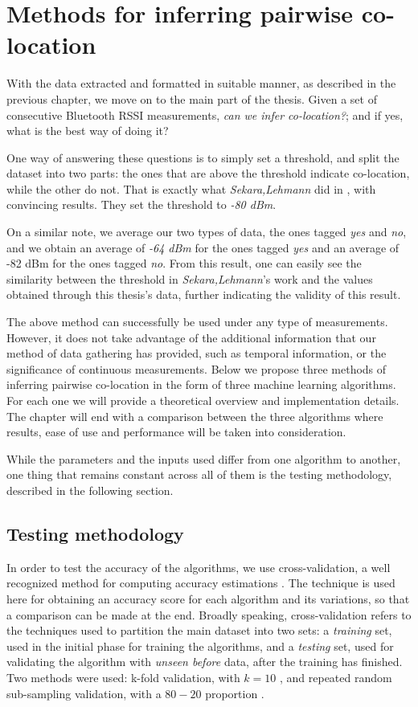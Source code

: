 \chapter{Methods for inferring pairwise co-location}

With the data extracted and formatted in suitable manner, as described in the previous chapter, we move on to the main part of the thesis. Given a set of consecutive Bluetooth RSSI measurements, \textit{can we infer co-location?}; and if yes, what is the best way of doing it? 

One way of answering these questions is to simply set a threshold, and split the dataset into two parts: the ones that are above the threshold indicate co-location, while the other do not. That is exactly what \textit{Sekara,Lehmann} did in \cite{vedran}, with convincing results. They set the threshold to \textit{ -80 dBm}. 

On a similar note, we average our two types of data, the ones tagged \textit{yes} and \textit{no}, and we obtain an average of \textit{-64 dBm} for the ones tagged \textit{yes} and an average of {-82 dBm} for the ones tagged \textit{no}. From this result, one can easily see the similarity between the threshold in \textit{Sekara,Lehmann}'s work and the values obtained through this thesis's data, further indicating the validity of this result. 

The above method can successfully be used under any type of measurements. However, it does not take advantage of the additional information that our method of data gathering has provided, such as temporal information, or the significance of continuous measurements. Below we propose three methods of inferring pairwise co-location in the form of three machine learning algorithms. For each one we will provide a theoretical overview and implementation details. The chapter will end with a comparison between the three algorithms where results, ease of use and performance will be taken into consideration. 

While the parameters and the inputs used differ from one algorithm to another, one thing that remains constant across all of them is the testing methodology, described in the following section.

\section{Testing methodology}

In order to test the accuracy of the algorithms, we use cross-validation, a well recognized method for computing accuracy estimations \cite{kohavi1995study}. The technique is used here for obtaining an accuracy score for each algorithm and its variations, so that a comparison can be made at the end. Broadly speaking, cross-validation refers to the techniques used to partition the main dataset into two sets: a \textit{training} set, used in the initial phase for training the algorithms, and a \textit{testing} set, used for validating the algorithm with \textit{unseen before} data, after the training has finished. Two methods were used: k-fold validation, with $k = 10$ \cite{kohavi1995study}, and repeated random sub-sampling validation, with a $80-20$ proportion \cite{segaran}. 

